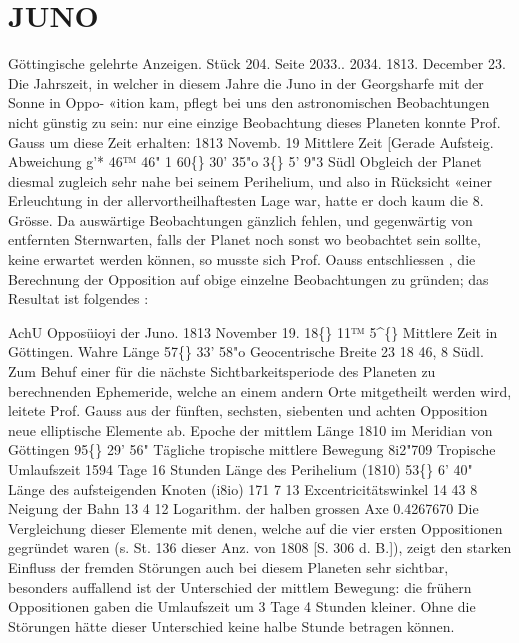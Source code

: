 \documentclass[12pt,a4paper]{article}
\newcommand{\degree}{\textdegree}
\begin{document}
\section*{JUNO}
Göttingische  gelehrte  Anzeigen.  Stück  204.  Seite  2033.. 2034.     1813.  December  23. 
Die  Jahrszeit,  in  welcher  in  diesem  Jahre  die  Juno  in  der  Georgsharfe  mit  der  Sonne  in  Oppo- 
«ition  kam,  pflegt  bei  uns  den  astronomischen  Beobachtungen  nicht  günstig  zu  sein:  nur  eine  einzige 
Beobachtung  dieses  Planeten  konnte  Prof.  Gauss  um  diese  Zeit  erhalten: 
1813 
Novemb.  19 
Mittlere  Zeit  [Gerade  Aufsteig.      Abweichung 
g'*  46™  46"     1     60\degree\{\}  30'   35"o  3\degree\{\}  5'  9"3  Südl 
Obgleich  der  Planet  diesmal  zugleich  sehr  nahe  bei  seinem  Perihelium,  und  also  in  Rücksicht 
«einer  Erleuchtung  in  der  allervortheilhaftesten  Lage  war,  hatte  er  doch  kaum  die  8.  Grösse. 
Da  auswärtige  Beobachtungen  gänzlich  fehlen,  und  gegenwärtig  von  entfernten  Sternwarten,  falls 
der  Planet  noch  sonst  wo  beobachtet  sein  sollte,  keine  erwartet  werden  können,  so  musste  sich  Prof. 
Oauss  entschliessen ,  die  Berechnung  der  Opposition  auf  obige  einzelne  Beobachtungen  zu  gründen;  das 
Resultat  ist  folgendes : 


\newpage
AchU   Opposüioyi  der  Juno. 
1813  November  19.  18\degree\{\}  11™  5\textasciicircum\{\}  Mittlere  Zeit  in  Göttingen. 
Wahre  Länge   
57\degree\{\}  33'    58"o 
Geocentrische  Breite   
23     18     46, 8  Südl. 
Zum  Behuf  einer  für  die  nächste  Sichtbarkeitsperiode  des  Planeten  zu  berechnenden  Ephemeride, 
welche  an  einem  andern  Orte  mitgetheilt  werden  wird,  leitete  Prof.  Gauss  aus  der  fünften,  sechsten, 
siebenten  und  achten  Opposition  neue  elliptische  Elemente  ab. 
Epoche  der  mittlem  Länge  1810  im  Meridian  von  Göttingen  95\degree\{\}  29'    56" 
Tägliche  tropische  mittlere  Bewegung    8i2"709 
Tropische  Umlaufszeit    1594  Tage  16  Stunden 
Länge  des  Perihelium  (1810)    53\degree\{\}     6'    40" 
Länge  des  aufsteigenden  Knoten  (i8io)    171      7     13 
Excentricitätswinkel    14    43      8 
Neigung  der  Bahn    13      4     12 
Logarithm.  der  halben  grossen  Axe    0.4267670 
Die  Vergleichung  dieser  Elemente  mit  denen,  welche  auf  die  vier  ersten  Oppositionen  gegründet 
waren  (s.  St.  136  dieser  Anz.  von  1808  [S.  306  d.  B.]),  zeigt  den  starken  Einfluss  der  fremden  Störungen 
auch  bei  diesem  Planeten  sehr  sichtbar,  besonders  auffallend  ist  der  Unterschied  der  mittlem  Bewegung: 
die  frühern  Oppositionen  gaben  die  Umlaufszeit  um  3  Tage  4  Stunden  kleiner.  Ohne  die  Störungen 
hätte  dieser  Unterschied  keine  halbe  Stunde  betragen  können. 
\end{document}
